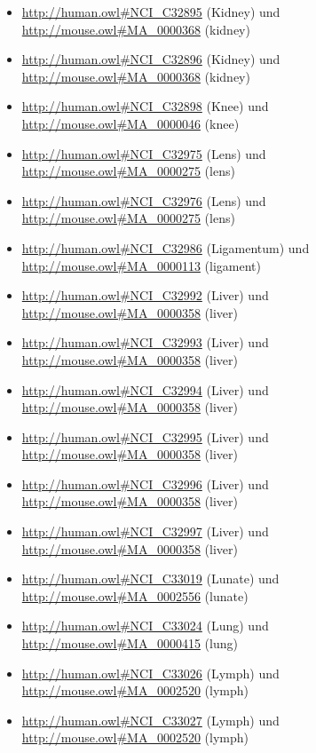 \begin{itemize}
	\item \url{http://human.owl#NCI_C32895} (Kidney\textunderscorePosterior\textunderscoreSurface) und \url{http://mouse.owl#MA_0000368} (kidney)
	\item \url{http://human.owl#NCI_C32896} (Kidney\textunderscoreUpper\textunderscoreLobe) und \url{http://mouse.owl#MA_0000368} (kidney)
	\item \url{http://human.owl#NCI_C32898} (Knee\textunderscoreJoint) und \url{http://mouse.owl#MA_0000046} (knee)
	\item \url{http://human.owl#NCI_C32975} (Lens\textunderscoreCapsule) und \url{http://mouse.owl#MA_0000275} (lens)
	\item \url{http://human.owl#NCI_C32976} (Lens\textunderscoreFiber) und \url{http://mouse.owl#MA_0000275} (lens)
	\item \url{http://human.owl#NCI_C32986} (Ligamentum\textunderscoreFlavum) und \url{http://mouse.owl#MA_0000113} (ligament)
	\item \url{http://human.owl#NCI_C32992} (Liver\textunderscoreAcinus) und \url{http://mouse.owl#MA_0000358} (liver)
	\item \url{http://human.owl#NCI_C32993} (Liver\textunderscoreAcinus\textunderscoreZone{}) und \url{http://mouse.owl#MA_0000358} (liver)
	\item \url{http://human.owl#NCI_C32994} (Liver\textunderscoreAcinus\textunderscoreZone{}) und \url{http://mouse.owl#MA_0000358} (liver)
	\item \url{http://human.owl#NCI_C32995} (Liver\textunderscoreAcinus\textunderscoreZone{}) und \url{http://mouse.owl#MA_0000358} (liver)
	\item \url{http://human.owl#NCI_C32996} (Liver\textunderscoreFissure) und \url{http://mouse.owl#MA_0000358} (liver)
	\item \url{http://human.owl#NCI_C32997} (Liver\textunderscoreLigament) und \url{http://mouse.owl#MA_0000358} (liver)
	\item \url{http://human.owl#NCI_C33019} (Lunate\textunderscoreSulcus) und \url{http://mouse.owl#MA_0002556} (lunate)
	\item \url{http://human.owl#NCI_C33024} (Lung\textunderscoreTissue) und \url{http://mouse.owl#MA_0000415} (lung)
	\item \url{http://human.owl#NCI_C33026} (Lymph\textunderscoreNode\textunderscoreAfferent\textunderscoreVessel) und \url{http://mouse.owl#MA_0002520} (lymph)
	\item \url{http://human.owl#NCI_C33027} (Lymph\textunderscoreNode\textunderscoreby\textunderscoreAnatomic\textunderscoreSite) und \url{http://mouse.owl#MA_0002520} (lymph)

\end{itemize}
